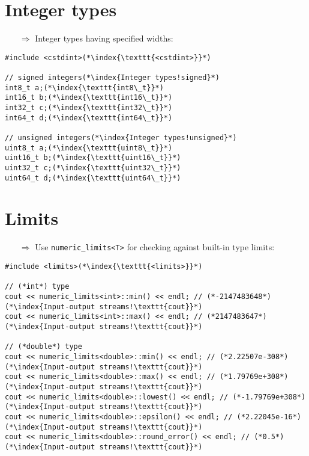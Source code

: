 \documentclass[10pt]{article}
\begin{document}
\section{Integer types}
\small
\begin{enumerate}
\item[$\Rightarrow$] Integer types having specified widths:
\end{enumerate}
\begin{lstlisting}
#include <cstdint>(*\index{\texttt{<cstdint>}}*)

// signed integers(*\index{Integer types!signed}*)
int8_t a;(*\index{\texttt{int8\_t}}*)
int16_t b;(*\index{\texttt{int16\_t}}*)
int32_t c;(*\index{\texttt{int32\_t}}*)
int64_t d;(*\index{\texttt{int64\_t}}*)

// unsigned integers(*\index{Integer types!unsigned}*)
uint8_t a;(*\index{\texttt{uint8\_t}}*)
uint16_t b;(*\index{\texttt{uint16\_t}}*)
uint32_t c;(*\index{\texttt{uint32\_t}}*)
uint64_t d;(*\index{\texttt{uint64\_t}}*)
\end{lstlisting}
%
%
\section{Limits}
\small
\begin{enumerate}
\item[$\Rightarrow$] Use \texttt{numeric\_limits<T>} for checking against built-in type limits:
\end{enumerate}
\begin{lstlisting}
#include <limits>(*\index{\texttt{<limits>}}*)

// (*int*) type
cout << numeric_limits<int>::min() << endl; // (*-2147483648*)(*\index{Input-output streams!\texttt{cout}}*)
cout << numeric_limits<int>::max() << endl; // (*2147483647*)(*\index{Input-output streams!\texttt{cout}}*)
    
// (*double*) type
cout << numeric_limits<double>::min() << endl; // (*2.22507e-308*)(*\index{Input-output streams!\texttt{cout}}*)
cout << numeric_limits<double>::max() << endl; // (*1.79769e+308*)(*\index{Input-output streams!\texttt{cout}}*)
cout << numeric_limits<double>::lowest() << endl; // (*-1.79769e+308*)(*\index{Input-output streams!\texttt{cout}}*)
cout << numeric_limits<double>::epsilon() << endl; // (*2.22045e-16*)(*\index{Input-output streams!\texttt{cout}}*)
cout << numeric_limits<double>::round_error() << endl; // (*0.5*)(*\index{Input-output streams!\texttt{cout}}*)
\end{lstlisting}
%
%
\end{document}
